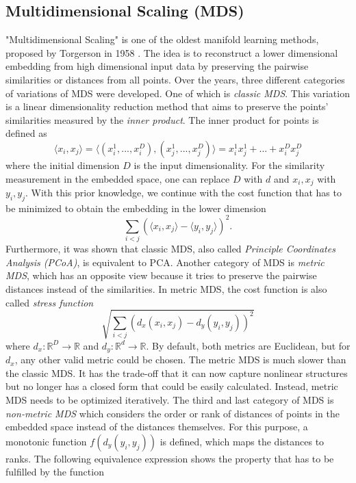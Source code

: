 \subsection{Multidimensional Scaling (MDS)}

"Multidimensional Scaling" is one of the oldest manifold learning methods, proposed by Torgerson in 1958 \cite{Torgerson52}. The idea is to reconstruct a lower dimensional embedding from high dimensional input data by preserving the pairwise similarities or distances from all points. Over the years, three different categories of variations of MDS were developed. One of which is \textit{classic MDS}. This variation is a linear dimensionality reduction method that aims to preserve the points' similarities measured by the \textit{inner product}. The inner product for points is defined as
\begin{equation}
   \langle x_i, x_j \rangle = \langle (x^1_i,...,x^D_i), (x^1_j,...,x^D_j) \rangle = x^1_i x^1_j + ... + x^D_i x^D_j 
\end{equation}
where the initial dimension $D$ is the input dimensionality. For the similarity measurement in the embedded space, one can replace $D$ with $d$ and $x_i, x_j$ with $y_i, y_j$. With this prior knowledge, we continue with the cost function that has to be minimized to obtain the embedding in the lower dimension
\begin{equation}
    \sum_{i<j} (\langle x_i,x_j\rangle - \langle y_i,y_j\rangle)^2.
\end{equation}
Furthermore, it was shown that classic MDS, also called \textit{Principle Coordinates Analysis (PCoA)}, is equivalent to PCA. \cite{ghojogh20} Another category of MDS is \textit{metric MDS}, which has an opposite view because it tries to preserve the pairwise distances instead of the similarities. In metric MDS, the cost function is also called \textit{stress function}
\begin{equation}
    \sqrt{\sum_{i<j} (d_x(x_i,x_j) - d_y(y_i,y_j))^2}
\end{equation}
where $d_x: \mathbb{R}^D \rightarrow \mathbb{R}$ and $d_y: \mathbb{R}^d \rightarrow \mathbb{R}$. By default, both metrics are Euclidean, but for $d_x$, any other valid metric could be chosen. The metric MDS is much slower than the classic MDS. It has the trade-off that it can now capture nonlinear structures but no longer has a closed form that could be easily calculated. Instead, metric MDS needs to be optimized iteratively. The third and last category of MDS is \textit{non-metric MDS} which considers the order or rank of distances of points in the embedded space instead of the distances themselves. For this purpose, a monotonic function $f(d_y(y_i,y_j))$ is defined, which maps the distances to ranks. The following equivalence expression shows the property that has to be fulfilled by the function
